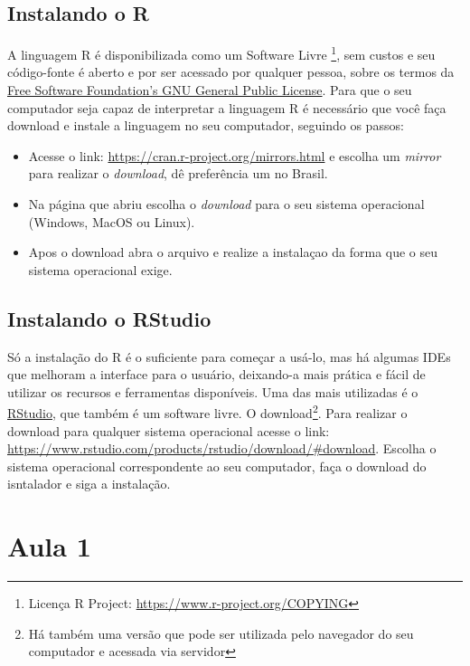 \documentclass[]{book}
\providecommand{\tightlist}{%
  \setlength{\itemsep}{0pt}\setlength{\parskip}{0pt}}
\let\rmarkdownfootnote\footnote%
\def\footnote{\protect\rmarkdownfootnote}
\theoremstyle{definition}
\theoremstyle{definition}
\theoremstyle{definition}
\theoremstyle{remark}
\begin{document}
\hypertarget{instalando-o-r}{%
\section{Instalando o R}\label{instalando-o-r}}

A linguagem R é disponibilizada como um Software Livre \footnote{Licença R Project: \url{https://www.r-project.org/COPYING}}, sem custos e seu código-fonte é aberto e por ser acessado por qualquer pessoa, sobre os termos da \href{https://www.gnu.org/}{Free Software Foundation's GNU General Public License}. Para que o seu computador seja capaz de interpretar a linguagem R é necessário que você faça download e instale a linguagem no seu computador, seguindo os passos:

\begin{itemize}
\tightlist
\item
  Acesse o link: \url{https://cran.r-project.org/mirrors.html} e escolha um \emph{mirror} para realizar o \emph{download}, dê preferência um no Brasil.
\item
  Na página que abriu escolha o \emph{download} para o seu sistema operacional (Windows, MacOS ou Linux).
\item
  Apos o download abra o arquivo e realize a instalaçao da forma que o seu sistema operacional exige.
\end{itemize}

\hypertarget{instalando-o-rstudio}{%
\section{Instalando o RStudio}\label{instalando-o-rstudio}}

Só a instalação do R é o suficiente para começar a usá-lo, mas há algumas IDEs que melhoram a interface para o usuário, deixando-a mais prática e fácil de utilizar os recursos e ferramentas disponíveis.
Uma das mais utilizadas é o \href{https://rstudio.com/}{RStudio}, que também é um software livre. O download\footnote{Há também uma versão que pode ser utilizada pelo navegador do seu computador e acessada via servidor}. Para realizar o download para qualquer sistema operacional acesse o link: \url{https://www.rstudio.com/products/rstudio/download/\#download}. Escolha o sistema operacional correspondente ao seu computador, faça o download do isntalador e siga a instalação.

\hypertarget{aula1}{%
\chapter{Aula 1}\label{aula1}}
\end{document}
